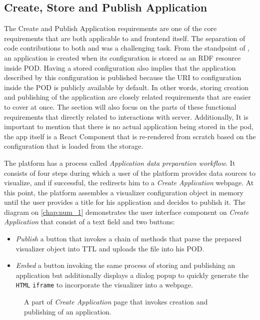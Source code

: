 \subsection{Create, Store and Publish Application}

The Create and Publish Application requirements are one of the core requirements that are both applicable to \lpas{} and \lpa{} frontend itself. The separation of code contributions to both \lpa{} and \lpas{} was a challenging task. From the standpoint of \lpas{}, an application is created when its configuration is stored as an RDF resource inside \solid{} POD. Having a stored configuration also implies that the application described by this configuration is published because the URI to configuration inside the POD is publicly available by default. In other words, storing creation and publishing of the application are closely related requirements that are easier to cover at once. The section will also focus on the parts of these functional requirements that directly related to interactions with \solid{} server. Additionally, It is important to mention that there is no actual application being stored in the \solid{} pod, the app itself is a React Component that is re-rendered from scratch based on the \lpa{} configuration that is loaded from the storage. 

The \lpa{} platform has a process called \textit{Application data preparation workflow}. It consists of four steps during which a user of the platform provides data sources to visualize, and if successful, the \lpa{} redirects him to a \textit{Create Application} webpage. At this point, the platform assembles a visualizer configuration object in memory until the user provides a title for his application and decides to publish it. The diagram on \autoref{chap:num_1} demonstrates the user interface component on \textit{Create Application} that consist of a text field and two buttons:
\begin{itemize}
    \item \textit{Publish} a button that invokes a chain of methods that parse the prepared visualizer object into TTL and uploads the file into his \solid{} POD.
    \item \textit{Embed} a button invoking the same process of storing and publishing an application but additionally displays a dialog popup to quickly generate the \texttt{HTML} \texttt{iframe} to incorporate the visualizer into a webpage.
\end{itemize}

\begin{figure}[h]
\centering
{}
\caption{A part of \textit{Create Application} page that invokes creation and publishing of an application.}
\label{fig:create_app_implementation_diagram}
\end{figure}

